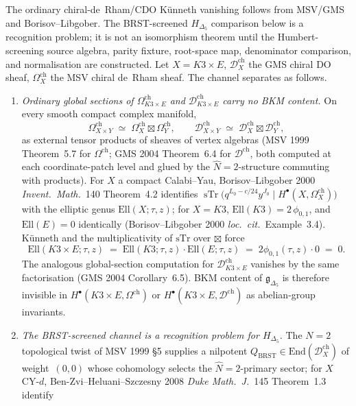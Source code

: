 \begin{theorem}
\label{thm:k3ca-cdo-malikov-beilinson-K3xE}
The ordinary chiral-de~Rham/CDO K\"unneth vanishing follows from
MSV/GMS and Borisov--Libgober.  The BRST-screened
\(H_{\Delta_5}\) comparison below is a recognition problem; it is not
an isomorphism theorem until the Humbert-screening source algebra,
parity fixture, root-space map, denominator comparison, and
normalisation are constructed.
Let $X=K3\times E$, $\mathcal D^{\mathrm{ch}}_X$ the GMS chiral DO sheaf, $\Omega^{\mathrm{ch}}_X$ the MSV chiral de~Rham sheaf. The channel separates as follows.
\begin{enumerate}[label=\textup{(\alph*)}]
\item \emph{Ordinary global sections of $\Omega^{\mathrm{ch}}_{K3\times E}$ and $\mathcal D^{\mathrm{ch}}_{K3\times E}$ carry no BKM content.} On every smooth compact complex manifold,
\[
 \Omega^{\mathrm{ch}}_{X\times Y}\;\simeq\;\Omega^{\mathrm{ch}}_X\boxtimes\Omega^{\mathrm{ch}}_Y,\qquad \mathcal D^{\mathrm{ch}}_{X\times Y}\;\simeq\;\mathcal D^{\mathrm{ch}}_X\boxtimes\mathcal D^{\mathrm{ch}}_Y,
\]
as external tensor products of sheaves of vertex algebras (MSV 1999 Theorem~5.7 for $\Omega^{\mathrm{ch}}$; GMS 2004 Theorem~6.4 for $\mathcal D^{\mathrm{ch}}$, both computed at each coordinate-patch level and glued by the $\hat{N}=2$-structure commuting with products). For $X$ a compact Calabi--Yau, Borisov--Libgober 2000 \emph{Invent.\ Math.}~140 Theorem~4.2 identifies $\operatorname{sTr}\bigl(q^{L_0-c/24}y^{J_0}\mid H^\bullet(X,\Omega^{\mathrm{ch}}_X)\bigr)$ with the elliptic genus $\mathrm{Ell}(X;\tau,z)$; for $X=K3$, $\mathrm{Ell}(K3)=2\,\phi_{0,1}$, and $\mathrm{Ell}(E)=0$ identically (Borisov--Libgober 2000 \emph{loc.\ cit.}~Example~3.4). K\"unneth and the multiplicativity of $\mathrm{sTr}$ over $\boxtimes$ force
\[
 \mathrm{Ell}(K3\times E;\tau,z)\;=\;\mathrm{Ell}(K3;\tau,z)\cdot\mathrm{Ell}(E;\tau,z)\;=\;2\phi_{0,1}(\tau,z)\cdot 0\;=\;0.
\]
The analogous global-section computation for $\mathcal D^{\mathrm{ch}}_{K3\times E}$ vanishes by the same factorisation (GMS 2004 Corollary~6.5). BKM content of $\mathfrak g_{\Delta_5}$ is therefore invisible in $H^\bullet(K3\times E,\Omega^{\mathrm{ch}})$ or $H^\bullet(K3\times E,\mathcal D^{\mathrm{ch}})$ as abelian-group invariants.
\item \emph{The BRST-screened channel is a recognition problem for \(H_{\Delta_5}\).} The $N=2$ topological twist of MSV 1999 \S5 supplies a nilpotent $Q_{\mathrm{BRST}}\in\mathrm{End}(\mathcal D^{\mathrm{ch}}_X)$ of weight~$(0,0)$ whose cohomology selects the $\hat{N}=2$-primary sector; for $X$ CY-$d$, Ben-Zvi--Heluani--Szczesny 2008 \emph{Duke Math.\ J.}~145 Theorem~1.3 identify

\end{enumerate}
\end{theorem}
